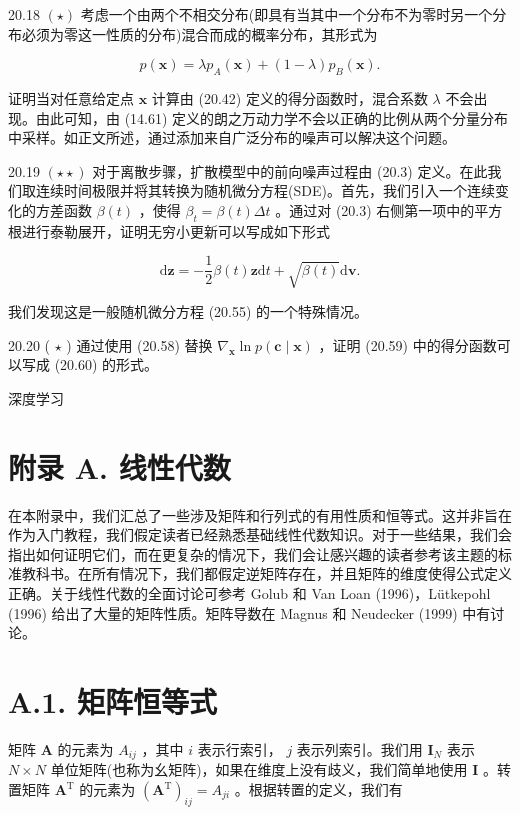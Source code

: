\documentclass[10pt]{article}
\begin{document}
20.18 \(\left( \star \right)\) 考虑一个由两个不相交分布(即具有当其中一个分布不为零时另一个分布必须为零这一性质的分布)混合而成的概率分布，其形式为

\[
p\left( \mathbf{x}\right)  = \lambda {p}_{A}\left( \mathbf{x}\right)  + \left( {1 - \lambda }\right) {p}_{B}\left( \mathbf{x}\right) . \tag{20.69}
\]

证明当对任意给定点 \(\mathbf{x}\) 计算由 (20.42) 定义的得分函数时，混合系数 \(\lambda\) 不会出现。由此可知，由 (14.61) 定义的朗之万动力学不会以正确的比例从两个分量分布中采样。如正文所述，通过添加来自广泛分布的噪声可以解决这个问题。

20.19 \(\left( {\star  \star  }\right)\) 对于离散步骤，扩散模型中的前向噪声过程由 (20.3) 定义。在此我们取连续时间极限并将其转换为随机微分方程(SDE)。首先，我们引入一个连续变化的方差函数 \(\beta \left( t\right)\) ，使得 \({\beta }_{t} = \beta \left( t\right) {\Delta t}\) 。通过对 (20.3) 右侧第一项中的平方根进行泰勒展开，证明无穷小更新可以写成如下形式

\[
\mathrm{d}\mathbf{z} =  - \frac{1}{2}\beta \left( t\right) \mathbf{z}\mathrm{d}t + \sqrt{\beta \left( t\right) }\mathrm{d}\mathbf{v}. \tag{20.70}
\]

我们发现这是一般随机微分方程 (20.55) 的一个特殊情况。

20.20 ( \(\star\) ) 通过使用 (20.58) 替换 \({\nabla }_{\mathbf{x}}\ln p\left( {\mathbf{c} \mid  \mathbf{x}}\right)\) ，证明 (20.59) 中的得分函数可以写成 (20.60) 的形式。

深度学习

\section*{附录 A. 线性代数}

在本附录中，我们汇总了一些涉及矩阵和行列式的有用性质和恒等式。这并非旨在作为入门教程，我们假定读者已经熟悉基础线性代数知识。对于一些结果，我们会指出如何证明它们，而在更复杂的情况下，我们会让感兴趣的读者参考该主题的标准教科书。在所有情况下，我们都假定逆矩阵存在，并且矩阵的维度使得公式定义正确。关于线性代数的全面讨论可参考 Golub 和 Van Loan (1996)，Lütkepohl (1996) 给出了大量的矩阵性质。矩阵导数在 Magnus 和 Neudecker (1999) 中有讨论。

\section*{A.1. 矩阵恒等式}

矩阵 \(\mathbf{A}\) 的元素为 \({A}_{ij}\) ，其中 \(i\) 表示行索引， \(j\) 表示列索引。我们用 \({\mathbf{I}}_{N}\) 表示 \(N \times  N\) 单位矩阵(也称为幺矩阵)，如果在维度上没有歧义，我们简单地使用 \(\mathbf{I}\) 。转置矩阵 \({\mathbf{A}}^{\mathrm{T}}\) 的元素为 \({\left( {\mathbf{A}}^{\mathrm{T}}\right) }_{ij} = {A}_{ji}\) 。根据转置的定义，我们有
\end{document}
